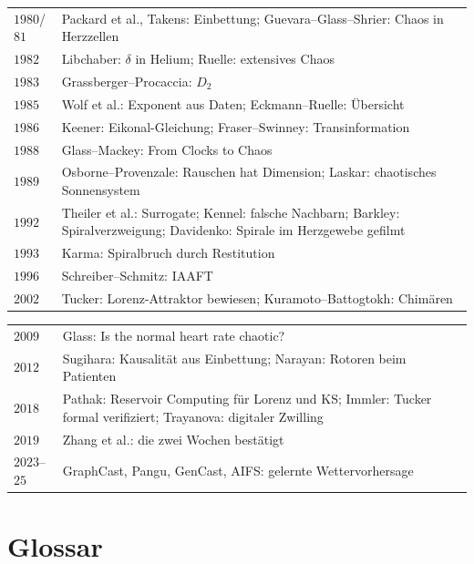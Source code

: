 \begin{merksatz}
\begin{center}
{\begin{tabular}{@{}P{1.2cm}P{7.4cm}@{}}
$1980$/$81$ & Packard et al., Takens: Einbettung; Guevara--Glass--Shrier: Chaos in Herzzellen\\
$1982$ & Libchaber: $\delta$ in Helium; Ruelle: extensives Chaos\\
$1983$ & Grassberger--Procaccia: $D_2$\\
$1985$ & Wolf et al.: Exponent aus Daten; Eckmann--Ruelle: Übersicht\\
$1986$ & Keener: Eikonal-Gleichung; Fraser--Swinney: Transinformation\\
$1988$ & Glass--Mackey: From Clocks to Chaos\\
$1989$ & Osborne--Provenzale: Rauschen hat Dimension; Laskar: chaotisches Sonnensystem\\
$1992$ & Theiler et al.: Surrogate; Kennel: falsche Nachbarn; Barkley: Spiralverzweigung; Davidenko: Spirale im Herzgewebe gefilmt\\
$1993$ & Karma: Spiralbruch durch Restitution\\
$1996$ & Schreiber--Schmitz: IAAFT\\
$2002$ & Tucker: Lorenz-Attraktor bewiesen; Kuramoto--Battogtokh: Chimären\\
\bottomrule
\end{tabular}}
\end{center}
\begin{center}
{\small
\renewcommand{\arraystretch}{1.42}
\begin{tabular}{@{}P{1.2cm}P{7.4cm}@{}}
\toprule
$2009$ & Glass: Is the normal heart rate chaotic?\\
$2012$ & Sugihara: Kausalität aus Einbettung; Narayan: Rotoren beim Patienten\\
$2018$ & Pathak: Reservoir Computing für Lorenz und KS; Immler: Tucker formal verifiziert; Trayanova: digitaler Zwilling\\
$2019$ & Zhang et al.: die zwei Wochen bestätigt\\
$2023$--$25$ & GraphCast, Pangu, GenCast, AIFS: gelernte Wettervorhersage\\
\bottomrule
\end{tabular}}
\end{center}
\end{merksatz}

\section{Glossar}

